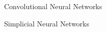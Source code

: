 \documentclass[../main.tex]{subfiles}
\begin{document}
    \begin{section}{Convolutional Neural Networks}
           
    \end{section}
    \begin{section}{Simplicial Neural Networks} 
            
    \end{section}
\end{document}
